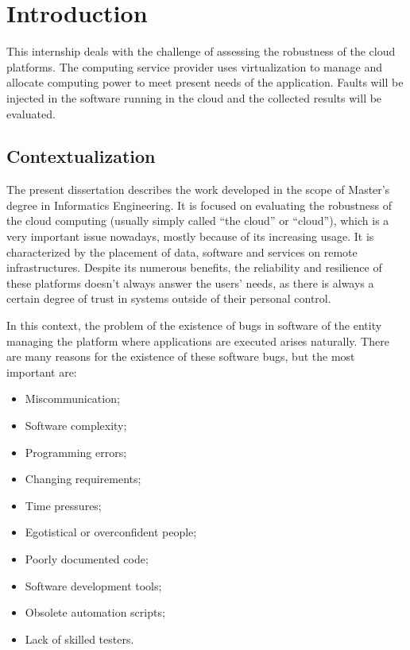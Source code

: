 \clearpage
\section{Introduction}

This internship deals with the challenge of assessing the robustness of the cloud platforms. The computing service provider uses virtualization to manage and allocate computing power to meet present needs of the application.
Faults will be injected in the software running in the cloud and the collected results will be evaluated.

\subsection{Contextualization}


The present dissertation describes the work developed in the scope of Master's degree in Informatics Engineering. It is focused on evaluating the robustness of the cloud computing (usually simply called ``the cloud'' or ``cloud''), which is a very important issue nowadays, mostly because of its increasing usage.
It is characterized by the placement of data, software and services on remote infrastructures.
Despite its numerous benefits, the reliability and resilience of these platforms doesn't always answer the users' needs, as there is always a certain degree of trust in systems outside of their personal control.

In this context, the problem of the existence of bugs in software of the entity managing the platform where applications are executed arises naturally. There are many reasons for the existence of these software bugs, but the most important are:

\begin{itemize}
	\item Miscommunication;
	\item Software complexity;
	\item Programming errors;
	\item Changing requirements;
	\item Time pressures;
	\item Egotistical or overconfident people;
	\item Poorly documented code;
	\item Software development tools;
	\item Obsolete automation scripts;
	\item Lack of skilled testers.
\end{itemize}

